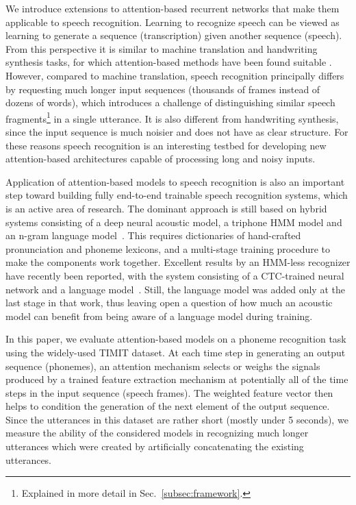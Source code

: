 \documentclass{article} %
\begin{document}
We introduce extensions to attention-based recurrent networks
that make them applicable to
speech recognition. Learning to recognize speech can be viewed as
learning to generate a sequence (transcription) given another sequence (speech).
From this perspective it is similar to machine translation and handwriting
synthesis tasks, for which attention-based methods have been found suitable
\cite{bahdanau_neural_2014,graves_generating_2013}.  However, compared to
machine translation, speech recognition principally differs by
requesting much longer input
sequences (thousands of frames instead of dozens of words), which introduces a
challenge of distinguishing similar speech fragments\footnote{Explained in
more detail in Sec.~\ref{subsec:framework}.} in a single utterance.
It is
also different from handwriting synthesis, since the input sequence is much
noisier and does not have as clear structure. For these reasons speech
recognition is an interesting testbed for developing new attention-based
architectures capable of processing long and noisy inputs.


Application of attention-based models to speech recognition is also an
important step toward building fully end-to-end trainable speech
recognition systems, which is an active area of research. The dominant
approach is still based
on hybrid systems consisting of a deep neural acoustic model, a triphone HMM
model and an n-gram language
model~\cite{gales_application_2007,hinton_deep_2012}. This requires dictionaries
of hand-crafted pronunciation and phoneme lexicons, and a multi-stage training
procedure to make the components work together. Excellent results by an HMM-less
recognizer have recently been reported, with the system consisting of a
CTC-trained neural network and a language model~\cite{hannun2014_deepspeech}.
Still, the language model was added only at the last stage in that work, thus
leaving open a question of how much an acoustic model can benefit from being
aware of a language model during training.


In this paper, we evaluate attention-based models on a
phoneme recognition task using the widely-used TIMIT
dataset. At each time step in generating an output sequence (phonemes),
an attention mechanism selects or weighs the signals produced
by a trained feature extraction mechanism at potentially all of the time steps 
in the input sequence (speech frames). The weighted feature vector then
helps to condition the generation of the next element of the output sequence.
Since the utterances in this dataset are rather
short (mostly under 5 seconds), we measure the
ability of the considered models in recognizing much longer
utterances which were created by artificially concatenating
the existing utterances.
\end{document}
